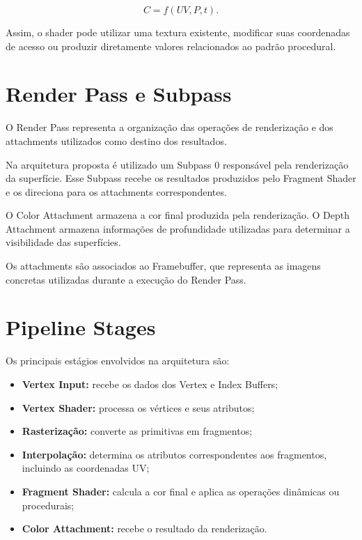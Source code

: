 \begin{equation}
C=f(UV,P,t).
\end{equation}

Assim, o shader pode utilizar uma textura existente, modificar suas
coordenadas de acesso ou produzir diretamente valores relacionados ao
padrão procedural.

\section{Render Pass e Subpass}

O Render Pass representa a organização das operações de renderização e dos
attachments utilizados como destino dos resultados.

Na arquitetura proposta é utilizado um Subpass 0 responsável pela
renderização da superfície. Esse Subpass recebe os resultados produzidos
pelo Fragment Shader e os direciona para os attachments correspondentes.

O Color Attachment armazena a cor final produzida pela renderização. O
Depth Attachment armazena informações de profundidade utilizadas para
determinar a visibilidade das superfícies.

Os attachments são associados ao Framebuffer, que representa as imagens
concretas utilizadas durante a execução do Render Pass.

\section{Pipeline Stages}

Os principais estágios envolvidos na arquitetura são:

\begin{itemize}
    \item \textbf{Vertex Input:} recebe os dados dos Vertex e Index Buffers;
    \item \textbf{Vertex Shader:} processa os vértices e seus atributos;
    \item \textbf{Rasterização:} converte as primitivas em fragmentos;
    \item \textbf{Interpolação:} determina os atributos correspondentes aos
    fragmentos, incluindo as coordenadas UV;
    \item \textbf{Fragment Shader:} calcula a cor final e aplica as operações
    dinâmicas ou procedurais;
    \item \textbf{Color Attachment:} recebe o resultado da renderização.
\end{itemize}

